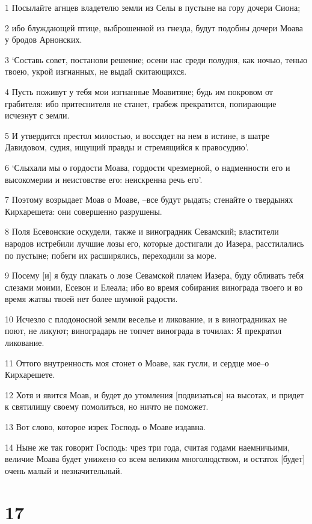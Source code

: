 \par 1 Посылайте агнцев владетелю земли из Селы в пустыне на гору дочери Сиона;
\par 2 ибо блуждающей птице, выброшенной из гнезда, будут подобны дочери Моава у бродов Арнонских.
\par 3 `Составь совет, постанови решение; осени нас среди полудня, как ночью, тенью твоею, укрой изгнанных, не выдай скитающихся.
\par 4 Пусть поживут у тебя мои изгнанные Моавитяне; будь им покровом от грабителя: ибо притеснителя не станет, грабеж прекратится, попирающие исчезнут с земли.
\par 5 И утвердится престол милостью, и воссядет на нем в истине, в шатре Давидовом, судия, ищущий правды и стремящийся к правосудию'.
\par 6 `Слыхали мы о гордости Моава, гордости чрезмерной, о надменности его и высокомерии и неистовстве его: неискренна речь его'.
\par 7 Поэтому возрыдает Моав о Моаве, --все будут рыдать; стенайте о твердынях Кирхарешета: они совершенно разрушены.
\par 8 Поля Есевонские оскудели, также и виноградник Севамский; властители народов истребили лучшие лозы его, которые достигали до Иазера, расстилались по пустыне; побеги их расширялись, переходили за море.
\par 9 Посему [и] я буду плакать о лозе Севамской плачем Иазера, буду обливать тебя слезами моими, Есевон и Елеала; ибо во время собирания винограда твоего и во время жатвы твоей нет более шумной радости.
\par 10 Исчезло с плодоносной земли веселье и ликование, и в виноградниках не поют, не ликуют; виноградарь не топчет винограда в точилах: Я прекратил ликование.
\par 11 Оттого внутренность моя стонет о Моаве, как гусли, и сердце мое--о Кирхарешете.
\par 12 Хотя и явится Моав, и будет до утомления [подвизаться] на высотах, и придет к святилищу своему помолиться, но ничто не поможет.
\par 13 Вот слово, которое изрек Господь о Моаве издавна.
\par 14 Ныне же так говорит Господь: чрез три года, считая годами наемничьими, величие Моава будет унижено со всем великим многолюдством, и остаток [будет] очень малый и незначительный.

\chapter{17}

